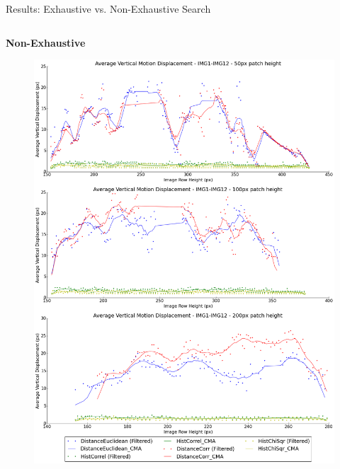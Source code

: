 \documentclass[10pt, compress]{beamer}
\begin{document}
\begin{frame}{Results: Exhaustive vs. Non-Exhaustive Search}


\vspace{-0.4cm}

\begin{columns}[T] %
\begin{column}{.48\textwidth}

\textbf{Non-Exhaustive}

\begin{figure}[ht!]
\centering
\vspace{0.1cm}
\includegraphics[scale=0.11]{flat_10cm_scaled}
\end{figure}


\end{column}
\end{columns}
\end{frame}
\end{document}

